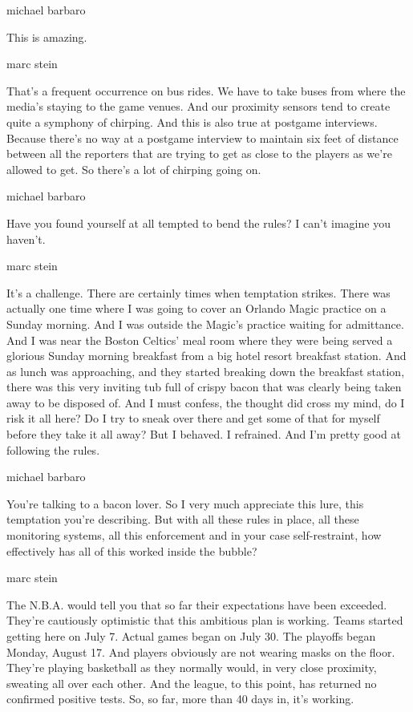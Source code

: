 michael barbaro

This is amazing.

marc stein

That's a frequent occurrence on bus rides. We have to take buses from
where the media's staying to the game venues. And our proximity sensors
tend to create quite a symphony of chirping. And this is also true at
postgame interviews. Because there's no way at a postgame interview to
maintain six feet of distance between all the reporters that are trying
to get as close to the players as we're allowed to get. So there's a lot
of chirping going on.

michael barbaro

Have you found yourself at all tempted to bend the rules? I can't
imagine you haven't.

marc stein

It's a challenge. There are certainly times when temptation strikes.
There was actually one time where I was going to cover an Orlando Magic
practice on a Sunday morning. And I was outside the Magic's practice
waiting for admittance. And I was near the Boston Celtics' meal room
where they were being served a glorious Sunday morning breakfast from a
big hotel resort breakfast station. And as lunch was approaching, and
they started breaking down the breakfast station, there was this very
inviting tub full of crispy bacon that was clearly being taken away to
be disposed of. And I must confess, the thought did cross my mind, do I
risk it all here? Do I try to sneak over there and get some of that for
myself before they take it all away? But I behaved. I refrained. And I'm
pretty good at following the rules.

michael barbaro

You're talking to a bacon lover. So I very much appreciate this lure,
this temptation you're describing. But with all these rules in place,
all these monitoring systems, all this enforcement and in your case
self-restraint, how effectively has all of this worked inside the
bubble?

marc stein

The N.B.A. would tell you that so far their expectations have been
exceeded. They're cautiously optimistic that this ambitious plan is
working. Teams started getting here on July 7. Actual games began on
July 30. The playoffs began Monday, August 17. And players obviously are
not wearing masks on the floor. They're playing basketball as they
normally would, in very close proximity, sweating all over each other.
And the league, to this point, has returned no confirmed positive tests.
So, so far, more than 40 days in, it's working.

